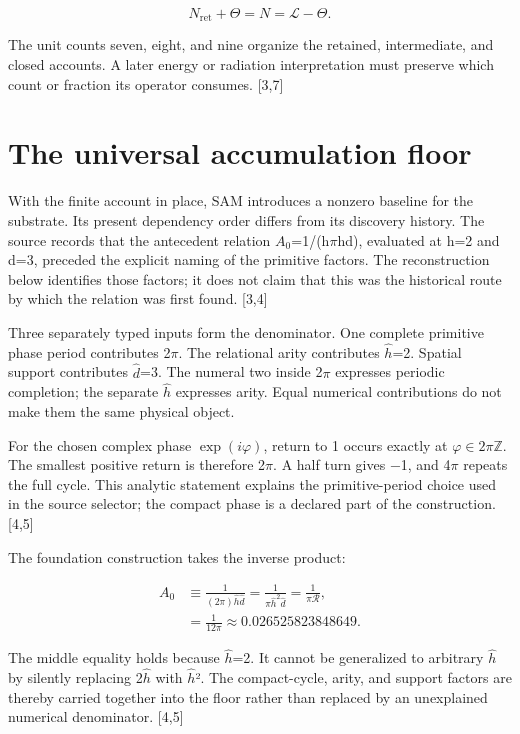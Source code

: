 \documentclass[10pt,twocolumn,letterpaper]{article}
\begin{document}
\begin{equation}
N_{\mathrm{ret}}+\Theta=N=\mathcal L-\Theta.
\end{equation}

The unit counts seven, eight, and nine organize the retained, intermediate, and closed accounts. A later energy or radiation interpretation must preserve which count or fraction its operator consumes. {[}3,7{]}

\section{The universal accumulation floor}\label{the-universal-accumulation-floor}

With the finite account in place, SAM introduces a nonzero baseline for the substrate. Its present dependency order differs from its discovery history. The source records that the antecedent relation \(A_0\)=1/(h\(\pi\)hd), evaluated at h=2 and d=3, preceded the explicit naming of the primitive factors. The reconstruction below identifies those factors; it does not claim that this was the historical route by which the relation was first found. {[}3,4{]}

Three separately typed inputs form the denominator. One complete primitive phase period contributes 2\(\pi\). The relational arity contributes \(\hat h\)=2. Spatial support contributes \(\hat d\)=3. The numeral two inside 2\(\pi\) expresses periodic completion; the separate \(\hat h\) expresses arity. Equal numerical contributions do not make them the same physical object.

For the chosen complex phase \(\exp(i\varphi)\), return to 1 occurs exactly at \(\varphi\in2\pi\mathbb Z\). The smallest positive return is therefore 2\(\pi\). A half turn gives −1, and 4\(\pi\) repeats the full cycle. This analytic statement explains the primitive-period choice used in the source selector; the compact phase is a declared part of the construction. {[}4,5{]}

The foundation construction takes the inverse product:

\begin{equation}
\begin{aligned}
A_0&\equiv\frac1{(2\pi)\hat h\hat d}
=\frac1{\pi\hat h^2\hat d}=\frac1{\pi\mathcal R},\\
&=\frac1{12\pi}\approx0.026525823848649.
\end{aligned}
\end{equation}

The middle equality holds because \(\hat h\)=2. It cannot be generalized to arbitrary \(\hat h\) by silently replacing 2\(\hat h\) with \(\hat h\)². The compact-cycle, arity, and support factors are thereby carried together into the floor rather than replaced by an unexplained numerical denominator. {[}4,5{]}
\end{document}
